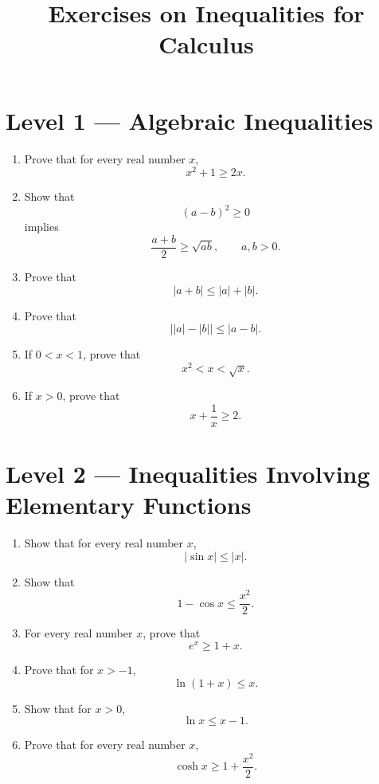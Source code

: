 \documentclass{essay}
\title{Exercises on Inequalities for Calculus}
\author{}
\date{}
\begin{document}
\maketitle

\section*{Level 1 --- Algebraic Inequalities}

\begin{enumerate}
    \item Prove that for every real number \(x\),
    \[
        x^2 + 1 \ge 2x.
    \]

    \item Show that
    \[
        (a-b)^2 \ge 0
    \]
    implies
    \[
        \frac{a+b}{2} \ge \sqrt{ab},
        \qquad a,b>0.
    \]

    \item Prove that
    \[
        |a+b| \le |a|+|b|.
    \]

    \item Prove that
    \[
        \bigl||a|-|b|\bigr| \le |a-b|.
    \]

    \item If \(0<x<1\), prove that
    \[
        x^2 < x < \sqrt{x}.
    \]

    \item If \(x>0\), prove that
    \[
        x+\frac{1}{x}\ge2.
    \]
\end{enumerate}

\section*{Level 2 --- Inequalities Involving Elementary Functions}

\begin{enumerate}[resume]

    \item Show that for every real number \(x\),
    \[
        |\sin x| \le |x|.
    \]

    \item Show that
    \[
        1-\cos x \le \frac{x^2}{2}.
    \]

    \item For every real number \(x\), prove that
    \[
        e^x \ge 1+x.
    \]

    \item Prove that for \(x>-1\),
    \[
        \ln(1+x)\le x.
    \]

    \item Show that for \(x>0\),
    \[
        \ln x \le x-1.
    \]

    \item Prove that for every real number \(x\),
    \[
        \cosh x \ge 1+\frac{x^2}{2}.
    \]
\end{enumerate}
\end{document}
